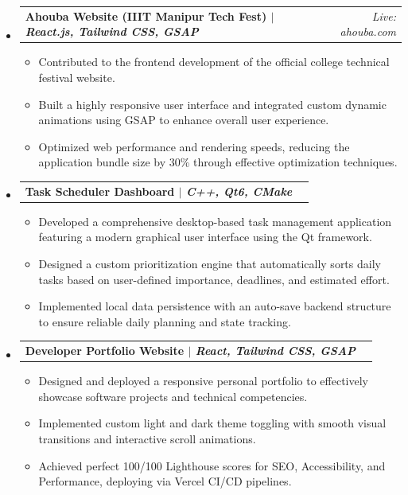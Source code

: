 \documentclass[11pt,a4paper]{article}
\makeatletter
\newcommand{\resumeProjectHeading}[2]{
    \begin{tabular*}{1\textwidth}[t]{l@{\extracolsep{\fill}}r}
      \textbf{#1} & \textit{#2} \\
    \end{tabular*}\vspace{-4pt}
}
\makeatother
\begin{document}
\begin{itemize}[leftmargin=0in, label={}, itemsep=4pt]
  \item \resumeProjectHeading
    {Ahouba Website (IIIT Manipur Tech Fest) $|$ \normalfont\textit{React.js, Tailwind CSS, GSAP}}{Live: ahouba.com}
    \begin{itemize}[leftmargin=0.15in, label={\textbullet}, topsep=2pt, itemsep=0pt]
      \item \small{Contributed to the frontend development of the official college technical festival website.}
      \item \small{Built a highly responsive user interface and integrated custom dynamic animations using GSAP to enhance overall user experience.}
      \item \small{Optimized web performance and rendering speeds, reducing the application bundle size by 30\% through effective optimization techniques.}
    \end{itemize}

  \item \resumeProjectHeading
    {Task Scheduler Dashboard $|$ \normalfont\textit{C++, Qt6, CMake}}{}
    \begin{itemize}[leftmargin=0.15in, label={\textbullet}, topsep=2pt, itemsep=0pt]
      \item \small{Developed a comprehensive desktop-based task management application featuring a modern graphical user interface using the Qt framework.}
      \item \small{Designed a custom prioritization engine that automatically sorts daily tasks based on user-defined importance, deadlines, and estimated effort.}
      \item \small{Implemented local data persistence with an auto-save backend structure to ensure reliable daily planning and state tracking.}
    \end{itemize}

  \item \resumeProjectHeading
    {Developer Portfolio Website $|$ \normalfont\textit{React, Tailwind CSS, GSAP}}{}
    \begin{itemize}[leftmargin=0.15in, label={\textbullet}, topsep=2pt, itemsep=0pt]
      \item \small{Designed and deployed a responsive personal portfolio to effectively showcase software projects and technical competencies.}
      \item \small{Implemented custom light and dark theme toggling with smooth visual transitions and interactive scroll animations.}
      \item \small{Achieved perfect 100/100 Lighthouse scores for SEO, Accessibility, and Performance, deploying via Vercel CI/CD pipelines.}
    \end{itemize}


\end{itemize}
\end{document}
